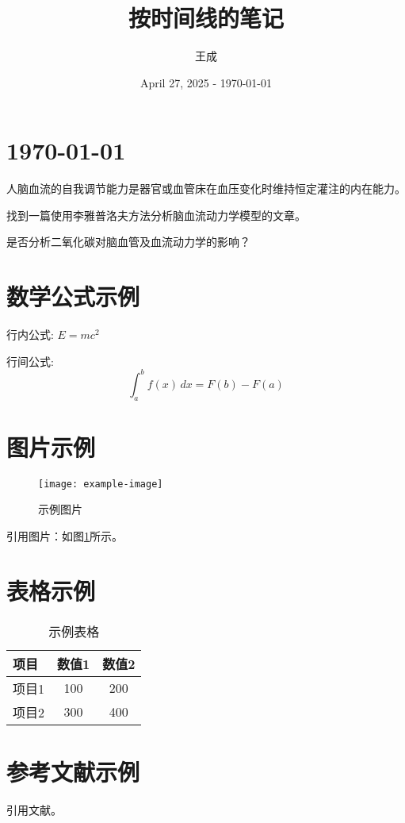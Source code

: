 \documentclass[12pt,a4paper]{article}
\title{按时间线的笔记}
\author{王成}
\date{April 27, 2025 - \today}
\begin{document}
\maketitle

\section{\today}

人脑血流的自我调节能力是器官或血管床在血压变化时维持恒定灌注的内在能力\cite{gaoMathematicalConsiderationsModeling1998}。

找到一篇使用李雅普洛夫方法分析脑血流动力学模型的文章\cite{golubevModelingCerebralBlood2022}。

是否分析二氧化碳对脑血管及血流动力学的影响\cite{ursinoModelCerebrovascularReactivity2010}？

\section{数学公式示例}
行内公式: $E=mc^2$

行间公式:
\begin{equation}
    \int_{a}^{b} f(x) \, dx = F(b) - F(a)
\end{equation}

\section{图片示例}
\begin{figure}[htbp]
    \centering
    \texttt{[image: example-image]} %
    \caption{示例图片}
    \label{fig:example}
\end{figure}

引用图片：如图\ref{fig:example}所示。

\section{表格示例}
\begin{table}[htbp]
    \centering
    \caption{示例表格}
    \begin{tabular}{lcc}
        \toprule
        项目 & 数值1 & 数值2 \\
        \midrule
        项目1 & 100 & 200 \\
        项目2 & 300 & 400 \\
        \bottomrule
    \end{tabular}
    \label{tab:example}
\end{table}

\section{参考文献示例}
引用文献\cite{agarwalMathematicalModelingPulsatile2008}。

\printbibliography
\end{document}
